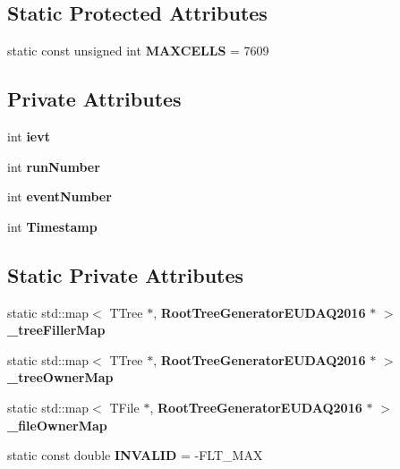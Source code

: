 \subsection*{Static Protected Attributes}
\begin{DoxyCompactItemize}
\item 
static const unsigned int {\bfseries MAXCELLS} = 7609\label{classCALICE_1_1RootTreeGeneratorEUDAQ2016_abde558aa96b4b0d60af193c9aeef45c4}

\end{DoxyCompactItemize}
\subsection*{Private Attributes}
\begin{DoxyCompactItemize}
\item 
int {\bfseries ievt}\label{classCALICE_1_1RootTreeGeneratorEUDAQ2016_a7a5b38d420f5c9bbffebed4a12fbc686}

\item 
int {\bfseries runNumber}\label{classCALICE_1_1RootTreeGeneratorEUDAQ2016_a9fa143e155360b6f645d0b19f5e83efa}

\item 
int {\bfseries eventNumber}\label{classCALICE_1_1RootTreeGeneratorEUDAQ2016_a87e4a3f01d9619d80dee5e3ce99e4bd3}

\item 
int {\bfseries Timestamp}\label{classCALICE_1_1RootTreeGeneratorEUDAQ2016_a9559dfea2413851744d5aa51f0634b25}

\end{DoxyCompactItemize}
\subsection*{Static Private Attributes}
\begin{DoxyCompactItemize}
\item 
static std::map$<$ TTree $\ast$, {\bf RootTreeGeneratorEUDAQ2016} $\ast$ $>$ {\bfseries \_\-treeFillerMap}\label{classCALICE_1_1RootTreeGeneratorEUDAQ2016_a903416643c6674afccaea80284251609}

\item 
static std::map$<$ TTree $\ast$, {\bf RootTreeGeneratorEUDAQ2016} $\ast$ $>$ {\bfseries \_\-treeOwnerMap}\label{classCALICE_1_1RootTreeGeneratorEUDAQ2016_a3308044bfa6b2926022e7b2d5c332535}

\item 
static std::map$<$ TFile $\ast$, {\bf RootTreeGeneratorEUDAQ2016} $\ast$ $>$ {\bfseries \_\-fileOwnerMap}\label{classCALICE_1_1RootTreeGeneratorEUDAQ2016_a15406fbbea39ab6fbca1f5feacfd2bfd}

\item 
static const double {\bfseries INVALID} = -\/FLT\_\-MAX\label{classCALICE_1_1RootTreeGeneratorEUDAQ2016_ab2522fe7595699b48a20555da4923c39}

\end{DoxyCompactItemize}


